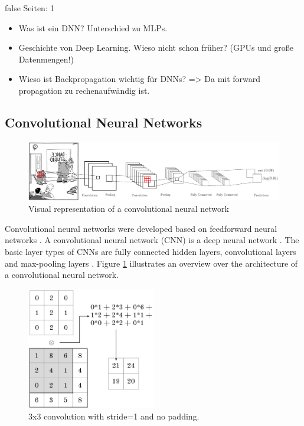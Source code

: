 \documentclass[draft,final,oneside]{vutinfth} %
\begin{document}
\if false
Seiten: 1
\begin{itemize}
\item Was ist ein DNN? Unterschied zu MLPs.
\item Geschichte von Deep Learning. Wieso nicht schon früher? (GPUs und große Datenmengen!)
\item Wieso ist Backpropagation wichtig für DNNs? => Da mit forward propagation zu rechenaufwändig ist.
\end{itemize}
\fi

\subsection{Convolutional Neural Networks} \label{mlcnn}

\begin{figure}[ht]
	\centering
  	\includegraphics[width=1.0\textwidth]{graphics/cnn.png}
	\caption{Visual representation of a convolutional neural network}
	\label{fig:cnn}
\end{figure}

Convolutional neural networks were developed based on feedforward neural networks \cite{bishop}. A convolutional neural network (CNN) is a deep neural network \cite{alexnet}. The basic layer types of CNNs are fully connected hidden layers, convolutional layers and max-pooling layers \cite{Goodfellow-et-al-2016}. Figure \ref{fig:cnn} illustrates an overview over the architecture of a convolutional neural network.

\begin{figure}[ht]
	\centering
  	\includegraphics[width=0.5\textwidth]{graphics/convolution.png}
	\caption{3x3 convolution with stride=1 and no padding.}
	\label{fig:convolution}
\end{figure}
\end{document}
